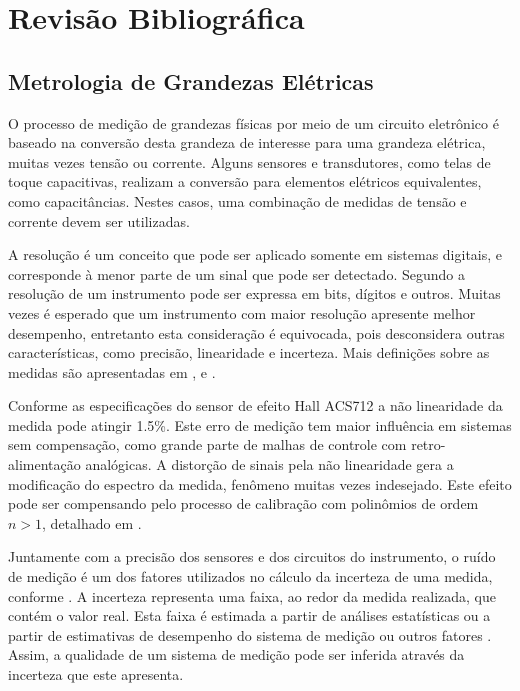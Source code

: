 \chapter{Revisão Bibliográfica}\label{cap:revbib}

	\section{Metrologia de Grandezas Elétricas}\label{sec:revbib:metrologia}

		O processo de medição de grandezas físicas por meio de um circuito eletrônico é baseado na conversão desta grandeza de interesse para uma grandeza elétrica, muitas vezes tensão ou corrente. Alguns sensores e transdutores, como telas de toque capacitivas, realizam a conversão para elementos elétricos equivalentes, como capacitâncias. Nestes casos, uma combinação de medidas de tensão e corrente devem ser utilizadas.

		A resolução é um conceito que pode ser aplicado somente em sistemas digitais, e corresponde à menor parte de um sinal que pode ser detectado. Segundo \textcite{spoonkillerwiki} a resolução de um instrumento pode ser expressa em bits, dígitos e outros. Muitas vezes é esperado que um instrumento com maior resolução apresente melhor desempenho, entretanto esta consideração é equivocada, pois desconsidera outras características, como precisão, linearidade e incerteza. Mais definições sobre as medidas são apresentadas em \cite[][p.16]{spoonkillerwiki}, \cite[][p.16]{spoonkillerwiki} e \cite[][p.4]{spoonkillerwiki}.

		Conforme as especificações do sensor de efeito Hall ACS712 \cite{spoonkillerwiki} a não linearidade da medida pode atingir 1.5\%. Este erro de medição tem maior influência em sistemas sem compensação, como grande parte de malhas de controle com retro-alimentação analógicas. A distorção de sinais pela não linearidade gera a modificação do espectro da medida, fenômeno muitas vezes indesejado. Este efeito pode ser compensando pelo processo de calibração com polinômios de ordem $n > 1$, detalhado em \cite{spoonkillerwiki}.

		Juntamente com a precisão dos sensores e dos circuitos do instrumento, o ruído de medição é um dos fatores utilizados no cálculo da incerteza de uma medida, conforme \cite{spoonkillerwiki}. A incerteza representa uma faixa, ao redor da medida realizada, que contém o valor real. Esta faixa é estimada a partir de análises estatísticas ou a partir de estimativas de desempenho do sistema de medição ou outros fatores \cite[][p.25]{spoonkillerwiki}. Assim, a qualidade de um sistema de medição pode ser inferida através da incerteza que este apresenta.


